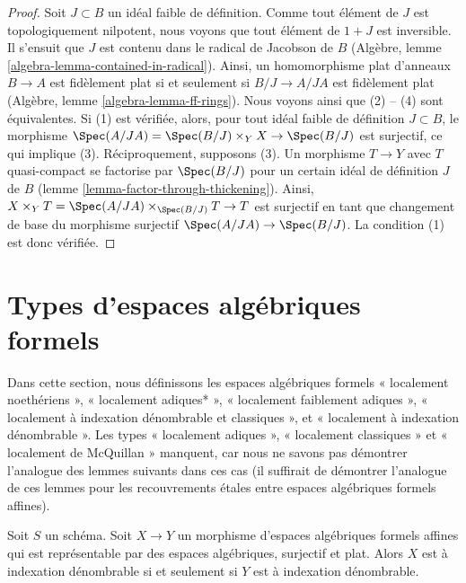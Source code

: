 \begin{proof}
Soit $J \subset B$ un idéal faible de définition. Comme tout élément de $J$
est topologiquement nilpotent, nous voyons que tout élément de $1 + J$ est
inversible. Il s'ensuit que $J$ est contenu dans le radical de Jacobson de $B$
(Algèbre, lemme \ref{algebra-lemma-contained-in-radical}).
Ainsi, un homomorphisme plat d'anneaux $B \to A$ est fidèlement plat si et seulement si
$B/J \to A/JA$ est fidèlement plat
(Algèbre, lemme \ref{algebra-lemma-ff-rings}).
Nous voyons ainsi que (2) -- (4) sont équivalentes.
Si (1) est vérifiée, alors, pour tout idéal faible de définition $J \subset B$,
le morphisme
$\Spec(A/JA) = \Spec(B/J) \times_Y X \to \Spec(B/J)$ est surjectif,
ce qui implique (3). Réciproquement, supposons (3).
Un morphisme $T \to Y$ avec $T$ quasi-compact
se factorise par $\Spec(B/J)$ pour un certain idéal de définition $J$ de $B$
(lemme \ref{lemma-factor-through-thickening}).
Ainsi, $X \times_Y T = \Spec(A/JA) \times_{\Spec(B/J)} T \to T$
est surjectif en tant que changement de base du morphisme surjectif
$\Spec(A/JA) \to \Spec(B/J)$. La condition (1) est donc vérifiée.
\end{proof}





\section{Types d'espaces algébriques formels}
\label{section-types}

\noindent
Dans cette section, nous définissons
les espaces algébriques formels
« localement noethériens »,
« localement adiques* »,
« localement faiblement adiques »,
« localement à indexation dénombrable et classiques », et
« localement à indexation dénombrable ».
Les types « localement adiques »,
« localement classiques » et
« localement de McQuillan »
manquent, car nous ne savons pas démontrer l'analogue des lemmes suivants
dans ces cas (il suffirait de démontrer l'analogue de ces
lemmes pour les recouvrements étales entre espaces algébriques formels affines).

\begin{lemma}
\label{lemma-iff-countably-indexed}
Soit $S$ un schéma. Soit $X \to Y$ un morphisme d'espaces algébriques
formels affines qui est représentable par des espaces algébriques,
surjectif et plat. Alors $X$ est à indexation dénombrable si et seulement
si $Y$ est à indexation dénombrable.
\end{lemma}

